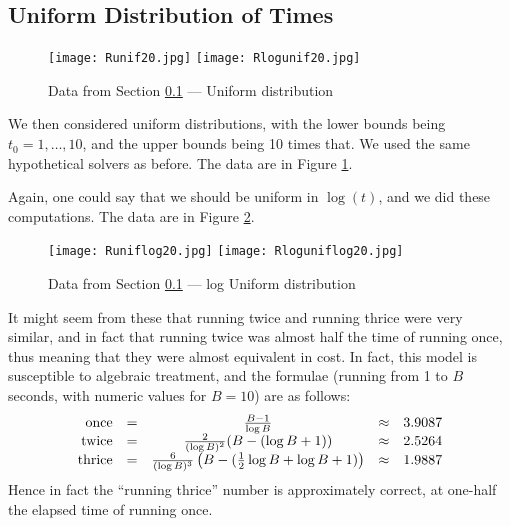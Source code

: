 \documentclass{easychair}
\begin{document}
\subsection{Uniform Distribution of Times}\label{sec:Uniform}
\begin{figure}[h]
\caption{Data from Section \ref{sec:Uniform} --- Uniform distribution\label{Fig:Uniform}}
\texttt{[image: Runif20.jpg]}
\texttt{[image: Rlogunif20.jpg]}
\end{figure}
We then considered uniform distributions, with the lower bounds being $t_0=1,\ldots,10$, and the upper bounds being 10 times that. We used the same hypothetical solvers as before.
The data are in Figure  \ref{Fig:Uniform}.

Again, one could say that we should be uniform in $\log(t)$, and we did these computations.
The data are in Figure  \ref{Fig:Uniformlog}.
\begin{figure}[h]
\caption{Data from Section \ref{sec:Uniform} --- log Uniform distribution\label{Fig:Uniformlog}}
\texttt{[image: Runiflog20.jpg]}
\texttt{[image: Rloguniflog20.jpg]}
\end{figure}
It might seem from these that running twice and running thrice were very similar, and in fact that running twice was almost half the time of running once, thus meaning that they were almost equivalent in cost. In fact, this model is susceptible to algebraic treatment,
and the formulae (running from 1 to $B$ seconds, with numeric values for $B=10$) are as follows:
\begin{equation*}
\begin{array}{rcccl}
\hbox{once}&=&\frac{B-1}{\log B}&\approx&3.9087\\
\hbox{twice}&=&\frac{2}{(\log B)^2}(B-(\log B +1))&\approx&2.5264\\
\hbox{thrice}&=&\frac{6}{(\log B)^3}\left(B-(\frac12\log B+\log B +1)\right)&\approx&1.9887\\
\end{array}
\end{equation*}
Hence in fact the ``running thrice'' number is approximately correct, at one-half the elapsed time of running once.
\end{document}

